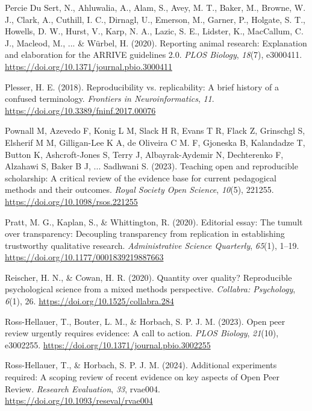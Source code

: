 \documentclass[authordate, meta]{jote-new-article}
\begin{document}
	Percie Du Sert, N., Ahluwalia, A., Alam, S., Avey, M. T., Baker, M., Browne, W. J., Clark, A., Cuthill, I. C., Dirnagl, U., Emerson, M., Garner, P., Holgate, S. T., Howells, D. W., Hurst, V., Karp, N. A., Lazic, S. E., Lidster, K., MacCallum, C. J., Macleod, M., ... \& Würbel, H. (2020). Reporting animal research: Explanation and elaboration for the ARRIVE guidelines 2.0. \emph{PLOS Biology}, \emph{18}(7), e3000411. \url{https://doi.org/10.1371/journal.pbio.3000411}



	Plesser, H. E. (2018). Reproducibility vs. replicability: A brief history of a confused terminology. \emph{Frontiers in Neuroinformatics}, \emph{11}. \url{https://doi.org/10.3389/fninf.2017.00076}



	Pownall M, Azevedo F, Konig L M, Slack H R, Evans T R, Flack Z, Grinschgl S, Elsherif M M, Gilligan-Lee K A, de Oliveira C M. F, Gjoneska B, Kalandadze T, Button K, Ashcroft-Jones S, Terry J, Albayrak-Aydemir N, Dechterenko F, Alzahawi S, Baker B J, ... Sadhwani S. (2023). Teaching open and reproducible scholarship: A critical review of the evidence base for current pedagogical methods and their outcomes. \emph{Royal Society Open Science}, \emph{10}(5), 221255. \url{https://doi.org/10.1098/rsos.221255}



	Pratt, M. G., Kaplan, S., \& Whittington, R. (2020). Editorial essay: The tumult over transparency: Decoupling transparency from replication in establishing trustworthy qualitative research. \emph{Administrative Science Quarterly}, \emph{65}(1), 1--19. \url{https://doi.org/10.1177/0001839219887663}



	Reischer, H. N., \& Cowan, H. R. (2020). Quantity over quality? Reproducible psychological science from a mixed methods perspective. \emph{Collabra: Psychology}, \emph{6}(1), 26. \url{https://doi.org/10.1525/collabra.284}



	Ross-Hellauer, T., Bouter, L. M., \& Horbach, S. P. J. M. (2023). Open peer review urgently requires evidence: A call to action. \emph{PLOS Biology}, \emph{21}(10), e3002255. \url{https://doi.org/10.1371/journal.pbio.3002255}



	Ross-Hellauer, T., \& Horbach, S. P. J. M. (2024). Additional experiments required: A scoping review of recent evidence on key aspects of Open Peer Review. \emph{Research Evaluation}, \emph{33}, rvae004. \url{https://doi.org/10.1093/reseval/rvae004}
\end{document}

